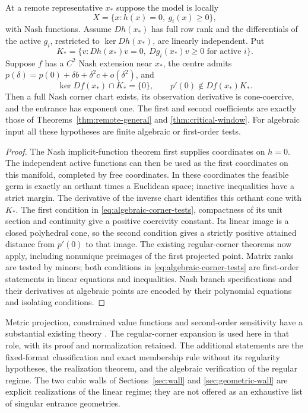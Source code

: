 \begin{proposition}\label{prop:corner-criterion}
At a remote representative $x_*$ suppose the model is locally
\[
 X=\{x:h(x)=0,\ g_i(x)\ge0\},
\]
with Nash functions. Assume $Dh(x_*)$ has full row rank and the
differentials of the active $g_i$, restricted to $\ker Dh(x_*)$, are
linearly independent. Put
\[
 K_* =\{v:Dh(x_*)v=0,\ Dg_i(x_*)v\ge0\text{ for active }i\}.
\]
Suppose $f$ has a $C^2$ Nash extension near $x_*$, the centre admits
$p(\delta)=p(0)+\delta b+\delta^2c+o(\delta^2)$, and
\begin{equation}\label{eq:algebraic-corner-tests}
 \ker Df(x_*)\cap K_* =\{0\},\qquad
 p'(0)\notin Df(x_*)K_*.
\end{equation}
Then a full Nash corner chart exists, its observation derivative is
cone-coercive, and the entrance has exponent one. The first and second
coefficients are exactly those of
Theorems~\ref{thm:remote-general} and \ref{thm:critical-window}.
For algebraic input all these hypotheses are finite algebraic or
first-order tests.
\end{proposition}
\begin{proof}
The Nash implicit-function theorem first supplies coordinates on $h=0$.
The independent active functions can then be used as the first
coordinates on this manifold, completed by free coordinates. In these
coordinates the feasible germ is exactly an orthant times a Euclidean
space; inactive inequalities have a strict margin. The derivative of
the inverse chart identifies this orthant cone with $K_*$. The first
condition in \eqref{eq:algebraic-corner-tests}, compactness of its unit
section and continuity give a positive coercivity constant. Its linear
image is a closed polyhedral cone, so the second condition gives a
strictly positive attained distance from $p'(0)$ to that image. The
existing regular-corner theorems now apply, including nonunique
preimages of the first projected point. Matrix ranks are tested by
minors; both conditions in \eqref{eq:algebraic-corner-tests} are
first-order statements in linear equations and inequalities. Nash
branch specifications and their derivatives at algebraic points are
encoded by their polynomial equations and isolating conditions.
\end{proof}

Metric projection, constrained value functions and second-order
sensitivity have a substantial existing theory
\cite{RW98,BS98,BS00}. The regular-corner expansion is used here in
that role, with its proof and normalization retained. The additional
statements are the fixed-format classification and exact membership
rule without its regularity hypotheses, the realization theorem, and
the algebraic verification of the regular regime. The two cubic walls
of Sections~\ref{sec:wall} and \ref{sec:geometric-wall} are explicit
realizations of the linear regime; they are not offered as an exhaustive
list of singular entrance geometries.
